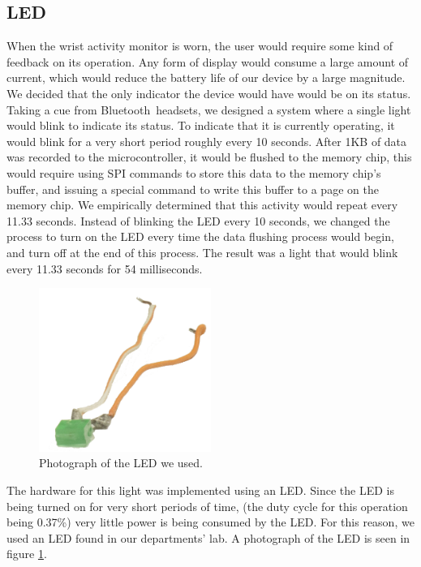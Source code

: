 \subsection{LED}
\label{Sec:LED}
When the wrist activity monitor is worn,
the user would require some kind of feedback on its operation.
Any form of display would consume a large amount of current,
which would reduce the battery life of our device by a large magnitude.
We decided that the only indicator the device would have would be on its status.
Taking a cue from Bluetooth\texttrademark ~headsets,
we designed a system where a single light would blink to indicate its status.
To indicate that it is currently operating, it would blink for a very short period roughly every 10 seconds.
After 1KB of data was recorded to the microcontroller, it would be flushed to the memory chip,
this would require using SPI commands to store this data to the memory chip's buffer,
and issuing a special command to write this buffer to a page on the memory chip.
We empirically determined that this activity would repeat every 11.33 seconds.
Instead of blinking the LED every 10 seconds, we changed the process to turn on the LED every time the data flushing process would begin,
and turn off at the end of this process.
The result was a light that would blink every 11.33 seconds for 54 milliseconds.
\begin{figure}
\begin{center}
\includegraphics[width=0.5\textwidth]{images/LEDPhoto.jpg}
\caption{Photograph of the LED we used.}
\label{Fig:LEDPHOTO}
\end{center}
\end{figure}
The hardware for this light was implemented using an LED.
Since the LED is being turned on for very short periods of time, 
(the duty cycle for this operation being 0.37\%) very little power is being consumed by the LED.
For this reason, we used an LED found in our departments' lab. A photograph of the LED is seen in figure \ref{Fig:LEDPHOTO}.

